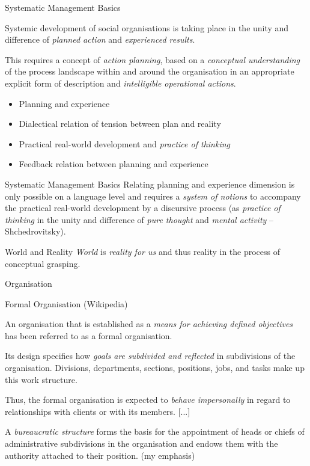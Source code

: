 \documentclass{beamer}
\begin{document}
\begin{frame}{Systematic Management Basics}

Systemic development of social organisations is taking place in the unity and
difference of \emph{planned action} and \emph{experienced results}.

This requires a concept of \emph{action planning}, based on a \emph{conceptual
  understanding} of the process landscape within and around the organisation
in an appropriate explicit form of description and \emph{intelligible
  operational actions}.
  
  \begin{itemize}
  \item Planning and experience
  \item Dialectical relation of tension between plan and reality
  \item Practical real-world development and \emph{practice of thinking}
  \item Feedback relation between planning and experience
  \end{itemize}

\end{frame}
  
\begin{frame}{Systematic Management Basics}
  Relating planning and experience dimension is only possible on a language
  level and requires a \emph{system of notions} to accompany the practical
  real-world development by a discursive process (as \emph{practice of
    thinking} in the unity and difference of \emph{pure thought} and
  \emph{mental activity} -- Shchedrovitsky).

  \begin{block}{World and Reality}
    \emph{World} is \emph{reality for us} and thus reality in the process of
    conceptual grasping.
  \end{block}
  
\end{frame}

\begin{frame}{Organisation}

  \begin{block}{Formal Organisation (Wikipedia)}
    
    An organisation that is established as a \emph{means for achieving defined
      objectives} has been referred to as a formal organisation.\medskip

    Its design specifies how \emph{goals are subdivided and reflected} in
    subdivisions of the organisation. Divisions, departments, sections,
    positions, jobs, and tasks make up this work structure.\medskip

    Thus, the formal organisation is expected to \emph{behave impersonally} in
    regard to relationships with clients or with its members. [...]\medskip

    A \emph{bureaucratic structure} forms the basis for the appointment of
    heads or chiefs of administrative subdivisions in the organisation and
    endows them with the authority attached to their position.  (my emphasis)
  \end{block}
\end{frame}
\end{document}
